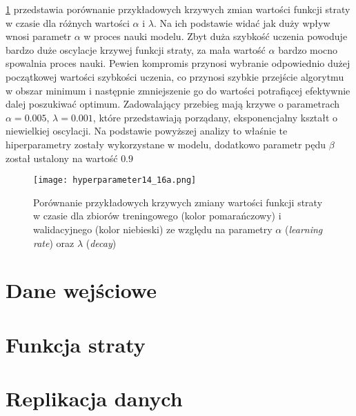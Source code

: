 \documentclass[]{article}
\theoremstyle{definition}
\begin{document}
\figurename{} \ref{fig:hyperparameters} przedstawia porównanie przykładowych krzywych zmian wartości funkcji straty w czasie dla różnych wartości $\alpha$ i $\lambda$. Na ich podstawie widać jak duży wpływ wnosi parametr $\alpha$ w proces nauki modelu. Zbyt duża szybkość uczenia powoduje bardzo duże oscylacje krzywej funkcji straty, za mała wartość $\alpha$ bardzo mocno spowalnia proces nauki. Pewien kompromis przynosi wybranie odpowiednio dużej początkowej wartości szybkości uczenia, co przynosi szybkie przejście algorytmu w obszar minimum i następnie zmniejszenie go do wartości potrafiącej efektywnie dalej poszukiwać optimum. Zadowalający przebieg mają krzywe o parametrach $\alpha = 0.005$, $\lambda = 0.001$, które przedstawiają porządany, eksponencjalny kształt o niewielkiej oscylacji. Na podstawie powyższej analizy to właśnie te hiperparametry zostały wykorzystane w modelu, dodatkowo parametr pędu $\beta$ został ustalony na wartość $0.9$



\begin{figure}[htp!]
	\centering
	\texttt{[image: hyperparameter14\_16a.png]}
	\caption{Porównanie przykładowych krzywych zmiany wartości funkcji straty w czasie dla zbiorów treningowego (kolor pomarańczowy) i walidacyjnego (kolor niebieski) ze względu na parametry $\alpha$ (\textit{learning rate}) oraz $\lambda$ (\textit{decay})}
	\label{fig:hyperparameters}
\end{figure}







\section{Dane wejściowe}

\section{Funkcja straty}

\section{Replikacja danych}
\end{document}
